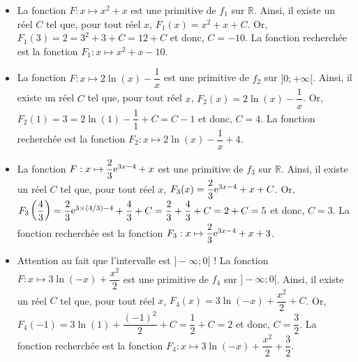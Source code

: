 \documentclass[11pt,fleqn, openany]{book} %
\begin{document}
\begin{solution}\hspace{0pt}

\begin{itemize}
\item 
La fonction \(F:x\mapsto x^2+x\) est une primitive de \(f_1\) sur \(\mathbb{R}\). Ainsi, il existe un réel \(C\) tel que, pour tout réel \(x\), \(F_1(x)=x^2+x+C\). Or, \(F_1(3)=2=3^2+3+C=12+C\) et donc, \(C=-10\). La fonction recherchée est la fonction \(F_1:x\mapsto x^2+x-10\).
\vskip5pt
\item 
La fonction \(F:x\mapsto 2\ln(x)-\dfrac{1}{x}\) est une primitive de \(f_2\) sur \(]0;+\infty[\). Ainsi, il existe un réel \(C\) tel que, pour tout réel \(x\), \(F_2(x)=2\ln(x)-\dfrac{1}{x}\). Or, \(F_2(1)=3=2\ln(1)-\dfrac{1}{1}+C=C-1\) et donc, \(C=4\). La fonction recherchée est la fonction \(F_2:x\mapsto 2\ln(x)-\dfrac{1}{x}+4\).
\vskip5pt
\item 
La fonction \(F:x\mapsto \dfrac{2}{3}\mathrm{e}^{3x-4}+x\) est une primitive de \(f_3\) sur \(\mathbb{R}\). Ainsi, il existe un réel \(C\) tel que, pour tout réel \(x\), \(F_3(x)=\dfrac{2}{3}\mathrm{e}^{3x-4}+x+C\). Or, \(F_3\left(\dfrac{4}{3}\right)=\dfrac{2}{3}\mathrm{e}^{3 \times (4/3)-4}+\dfrac{4}{3}+C=\dfrac{2}{3}+\dfrac{4}{3}+C=2+C=5\) et donc, \(C=3\). La fonction recherchée est la fonction \(F_3:x\mapsto \dfrac{2}{3}\mathrm{e}^{3x-4}+x+3\).
\vskip5pt

\item Attention au fait que l'intervalle est \(]-\infty ; 0[\) ! La fonction \(F:x \mapsto 3\ln(-x)+\dfrac{x^2}{2}\) est une primitive de \(f_4\) sur \(]-\infty ; 0[\). Ainsi, il existe un réel \(C\) tel que, pour tout réel \(x\), \(F_4(x)=3\ln(-x)+\dfrac{x^2}{2}+C\). Or, \(F_4(-1)=3\ln(1)+\dfrac{(-1)^2}{2}+C=\dfrac{1}{2}+C=2\) et donc, \(C=\dfrac{3}{2}\). La fonction recherchée est la fonction \(F_4:x\mapsto 3\ln(-x)+\dfrac{x^2}{2}+\dfrac{3}{2}\).

\end{itemize} \end{solution}
\end{document}
